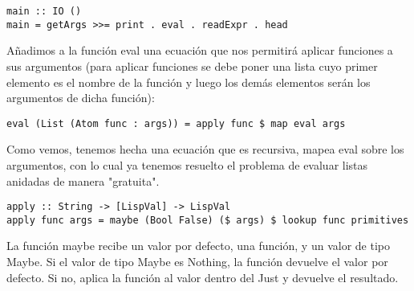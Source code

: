 \begin{minipage}{\linewidth}
\begin{small}
\begin{lstlisting}[frame=single]
main :: IO ()
main = getArgs >>= print . eval . readExpr . head
\end{lstlisting}
\end{small}
\end{minipage}

A\~nadimos a la funci\'on eval una ecuaci\'on que nos permitir\'a aplicar funciones a sus argumentos (para aplicar funciones se debe poner una lista cuyo primer elemento es el nombre de la funci\'on y luego los dem\'as elementos ser\'an los argumentos de dicha funci\'on):\\

\begin{minipage}{\linewidth}
\begin{small}
\begin{lstlisting}[frame=single]
eval (List (Atom func : args)) = apply func $ map eval args
\end{lstlisting}
\end{small}
\end{minipage}

Como vemos, tenemos hecha una ecuaci\'on que es recursiva, mapea eval sobre los argumentos, con lo cual ya tenemos resuelto el problema de evaluar listas anidadas de manera "gratuita".\\

\begin{minipage}{\linewidth}
\begin{small}
\begin{lstlisting}[frame=single]
apply :: String -> [LispVal] -> LispVal
apply func args = maybe (Bool False) ($ args) $ lookup func primitives
\end{lstlisting}
\end{small}
\end{minipage}

La funci\'on maybe recibe un valor por defecto, una funci\'on, y un valor de tipo Maybe. Si el valor de tipo Maybe es Nothing, la funci\'on devuelve el valor por defecto. Si no, aplica la funci\'on al valor dentro del Just y devuelve el resultado.\\


